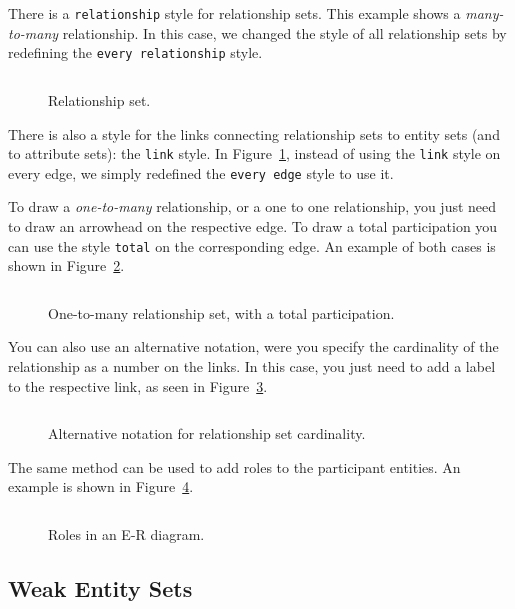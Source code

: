 \documentclass[12pt]{article}
\newcommand{\demo}[1]{
  \bigskip
  \begin{minipage}{\linewidth}
      \begin{center}
          
      \end{center}
      \begin{center}
          \scriptsize
          \inputminted{latex}{snippets/#1.tex}
      \end{center}
  \end{minipage}
}
\begin{document}
There is a \texttt{relationship} style for relationship sets. This example
shows a \emph{many-to-many} relationship. In this case, we changed the style of
all relationship sets by redefining the \texttt{every relationship} style.

\begin{figure}[htb!]
    \centering
    \demo{relationshipM-M}
    \caption{Relationship set.}
\label{fig:relationship}
\end{figure}

There is also a style for the links connecting relationship sets to entity sets
(and to attribute sets): the \texttt{link} style. In
Figure~\ref{fig:relationship}, instead of using the \texttt{link} style on
every edge, we simply redefined the \texttt{every edge} style to use it.

To draw a \emph{one-to-many} relationship, or a one to one relationship, you
just need to draw an arrowhead on the respective edge. To draw a total
participation you can use the style \texttt{total} on the corresponding edge. An
example of both cases is shown in Figure~\ref{fig:relationship1-M}.

\begin{figure}[htb!]
    \centering
    \demo{relationship1-M}
    \caption{One-to-many relationship set, with a total participation.}
\label{fig:relationship1-M}
\end{figure}

You can also use an alternative notation, were you specify the cardinality of
the relationship as a number on the links. In this case, you just need to add a
label to the respective link, as seen in Figure~\ref{fig:relationship-card}.

\begin{figure}[htb!]
    \centering
    \demo{relationship-card}
    \caption{Alternative notation for relationship set cardinality.}
\label{fig:relationship-card}
\end{figure}

The same method can be used to add roles to the participant entities. An
example is shown in Figure~\ref{fig:roles}.

\begin{figure}[htb!]
    \centering
    \demo{roles}
    \caption{Roles in an E-R diagram.}
\label{fig:roles}
\end{figure}

\subsection{Weak Entity Sets}
\label{sec:weak-entities}
\end{document}
